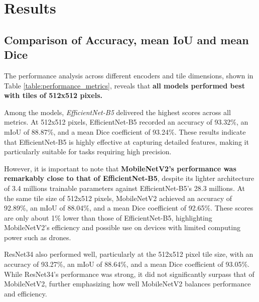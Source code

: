 \documentclass[a4paper]{article}
\begin{document}
\section{Results}
\subsection{Comparison of Accuracy, mean IoU and mean Dice}
The performance analysis across different encoders and tile dimensions, shown in Table \ref{table:performance_metrics}, reveals that \textbf{all models performed best with tiles of 512x512 pixels.}

Among the models, \textit{EfficientNet-B5} delivered the highest scores across all metrics. At 512x512 pixels, EfficientNet-B5 recorded an accuracy of 93.32\%, an mIoU of 88.87\%, and a mean Dice coefficient of 93.24\%. These results indicate that EfficientNet-B5 is highly effective at capturing detailed features, making it particularly suitable for tasks requiring high precision.

However, it is important to note that \textbf{MobileNetV2's performance was remarkably close to that of EfficientNet-B5}, despite its lighter architecture of 3.4 millions trainable parameters against EfficientNet-B5's 28.3 millions. At the same tile size of 512x512 pixels, MobileNetV2 achieved an accuracy of 92.89\%, an mIoU of 88.04\%, and a mean Dice coefficient of 92.65\%. These scores are only about 1\% lower than those of EfficientNet-B5, highlighting MobileNetV2's efficiency and possible use on devices with limited computing power such as drones.

ResNet34 also performed well, particularly at the 512x512 pixel tile size, with an accuracy of 93.27\%, an mIoU of 88.64\%, and a mean Dice coefficient of 93.05\%. While ResNet34's performance was strong, it did not significantly surpass that of MobileNetV2, further emphasizing how well MobileNetV2 balances performance and efficiency.
\end{document}
